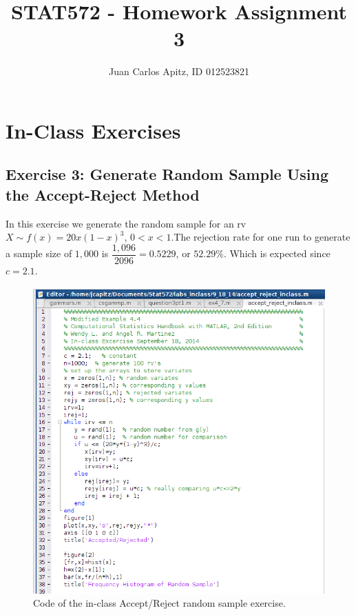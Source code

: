 \documentclass[12pt,a4paper]{article}
\author{Juan Carlos Apitz, ID 012523821}
\title{STAT572 - Homework Assignment 3}
\begin{document}
\maketitle

\section*{In-Class Exercises}

\subsection*{Exercise 3: Generate Random Sample Using the Accept-Reject Method}

In this exercise we generate the random sample for an rv $X\sim f(x)=20x(1-x)^3$, $0<x<1$.The rejection rate for one run to generate a sample size of $1,000$ is $\dfrac{1,096}{2096}=0.5229$, or $52.29\%$. Which is expected since $c=2.1$.

\begin{figure}[ht!]
\begin{center}
\includegraphics[scale=.50]{inClass2_acceptReject_code.png}
\caption{Code of the in-class Accept/Reject random sample exercise.}
\label{inclass2fig1}
\end{center}
\end{figure}
\FloatBarrier
\end{document}
